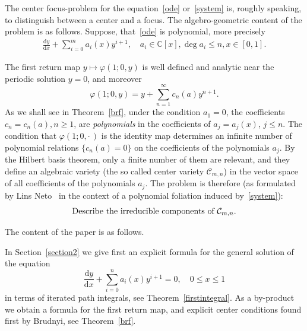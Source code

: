 \documentclass[11pt]{article}
\theoremstyle{definition}
\numberwithin{equation}{section}
\numberwithin{figure}{section}
\numberwithin{table}{section}
\newcommand*{\dd}{\mathrm{d}}
\newcommand*{\dx}{\dd x}
\newcommand*{\dy}{\dd y}
\newcommand{\Cbb}{\mathbb C}
\begin{document}
The center focus-problem for the equation~\eqref{ode} or~\eqref{system} is, roughly speaking, to distinguish between a center and a focus. The algebro-geometric content of the problem is as follows. Suppose, that~\eqref{ode} is polynomial, more precisely
\begin{align}\label{ode2}
\frac{\dy}{\dx} + \sum_{i=0}^m a_i(x) y^{i+1},\quad a_i \in \Cbb[x], \deg a_i \leq n, x \in [0,1].
\end{align}

The first return map $y \mapsto \varphi(1;0,y)$ is well defined and analytic near the periodic solution $y=0$, and moreover
\[
\varphi(1;0,y) = y + \sum_{n=1}^\infty c_n(a) y^{n+1}.
\]
As we shall see in Theorem~\ref{brf}, under the condition $a_1=0$, the coefficients\linebreak $c_n=c_n(a), n\geq 1$, are \emph{polynomials} in the coefficients of $a_j = a_j(x)$, $j\leq n$. The condition that $\varphi(1;0,{\cdot\,})$ is the identity map determines an infinite number of polynomial relations $\{ c_n(a)=0 \}$ on the coefficients of the polynomials $a_j$. By the Hilbert basis theorem, only a finite number of them are relevant, and they define an algebraic variety (the so called center variety $\mathcal C_{m,n}$) in the vector space of all coefficients of the polynomials $a_j$. The problem is therefore (as formulated by Lins Neto~\cite{lins14} in the context of a polynomial foliation induced by~\eqref{system}):
\[
\text{\emph{Describe the irreducible components of $\mathcal C_{m,n}$.}}
\]

\goodbreak
The content of the paper is as follows.

In Section~\ref{section2} we give first an explicit formula for the general solution of the equation
\[
\frac{\dy}{\dx} + \sum_{i=0}^n a_i(x) y^{i+1} = 0,\quad 0\leq x \leq 1
\]
in terms of iterated path integrals, see Theorem~\ref{firstintegral}. As a by-product we obtain a formula for the first return map, and explicit center conditions found first by Brudnyi, see Theorem~\ref{brf}.
\end{document}
